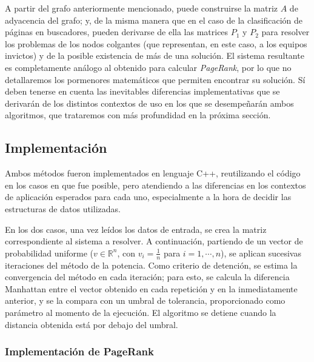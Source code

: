         A partir del grafo anteriormente mencionado, puede construirse la matriz $A$ de adyacencia del grafo; y, de la misma manera que en el caso de la clasificación de páginas en buscadores, pueden derivarse de ella las matrices $P_1$ y $P_2$ para resolver los problemas de los nodos colgantes (que representan, en este caso, a los equipos invictos) y de la posible existencia de más de una solución. El sistema resultante es completamente análogo al obtenido para calcular \emph{PageRank}, por lo que no detallaremos los pormenores matemáticos que permiten encontrar su solución. Sí deben tenerse en cuenta las inevitables diferencias implementativas que se derivarán de los distintos contextos de uso en los que se desempeñarán ambos algoritmos, que trataremos con más profundidad en la próxima sección.

    \subsection{Implementación}

    Ambos métodos fueron implementados en lenguaje C++, reutilizando el código en los casos en que fue posible, pero atendiendo a las diferencias en los contextos de aplicación esperados para cada uno, especialmente a la hora de decidir las estructuras de datos utilizadas.

    En los dos casos, una vez leídos los datos de entrada, se crea la matriz correspondiente al sistema a resolver. A continuación, partiendo de un vector de probabilidad uniforme ($v \in \mathbb{R}^n$, con $v_i = \frac{1}{n}$ para $i = 1, \cdots, n$), se aplican sucesivas iteraciones del método de la potencia. Como criterio de detención, se estima la convergencia del método en cada iteración; para esto, se calcula la diferencia Manhattan entre el vector obtenido en cada repetición y en la inmediatamente anterior, y se la compara con un umbral de tolerancia, proporcionado como parámetro al momento de la ejecución. El algoritmo se detiene cuando la distancia obtenida está por debajo del umbral.

        \subsubsection{Implementación de PageRank}

